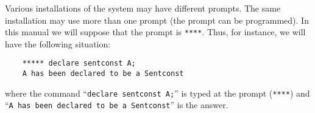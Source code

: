 Various installations of the system may have different prompts.
The same installation may use more than one prompt (the prompt can be programmed).
In this manual we will suppose that the prompt is {\tt *****}.
Thus, for instance, we will have the following situation:

\begin{verbatim}
	***** declare sentconst A;
	A has been declared to be a Sentconst
\end{verbatim}

where the command ``{\tt declare sentconst A;}'' is typed at the {\GF} prompt
({\tt *****}) and ``{\tt A has been declared to be a Sentconst}'' is the {\GF}
answer.
